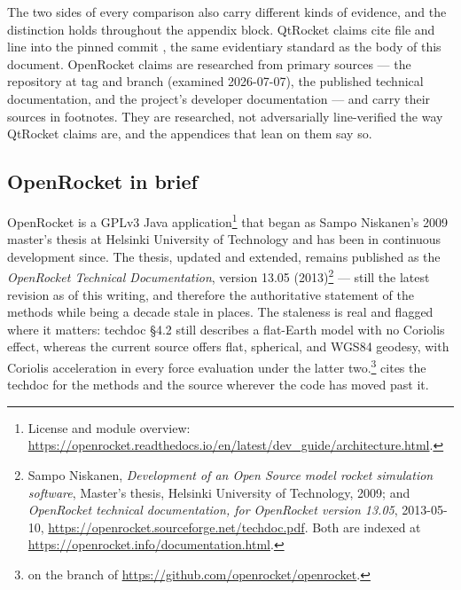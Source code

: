 The two sides of every comparison also carry different kinds of evidence, and the
distinction holds throughout the appendix block. QtRocket claims cite file and line into
the pinned commit , the same evidentiary standard as the body of this
document. OpenRocket claims are researched from primary sources --- the
 repository at tag  and branch
 (examined 2026-07-07), the published technical documentation, and the
project's developer documentation --- and carry their sources in footnotes. They are
researched, not adversarially line-verified the way QtRocket claims are, and the
appendices that lean on them say so.

\subsection{OpenRocket in brief}\label{app:or-context-brief}

OpenRocket is a GPLv3 Java application\footnote{License and module overview:
\url{https://openrocket.readthedocs.io/en/latest/dev_guide/architecture.html}.} that began
as Sampo Niskanen's 2009 master's thesis at Helsinki University of Technology and has been
in continuous development since. The thesis, updated and extended, remains published as
the \emph{OpenRocket Technical Documentation}, version 13.05
(2013)\footnote{Sampo Niskanen, \emph{Development of an Open Source model rocket
simulation software}, Master's thesis, Helsinki University of Technology, 2009; and
\emph{OpenRocket technical documentation, for OpenRocket version 13.05}, 2013-05-10,
\url{https://openrocket.sourceforge.net/techdoc.pdf}. Both are indexed at
\url{https://openrocket.info/documentation.html}.} --- still the latest revision as of
this writing, and therefore the authoritative statement of the methods while being a
decade stale in places. The staleness is real and flagged where it matters: techdoc
\S 4.2 still describes a flat-Earth model with no Coriolis effect, whereas the current
source offers flat, spherical, and WGS84 geodesy, with Coriolis acceleration in every force
evaluation under the latter two.\footnote{ on the 
branch of \url{https://github.com/openrocket/openrocket}.}  cites the
techdoc for the methods and the source wherever the code has moved past it.

